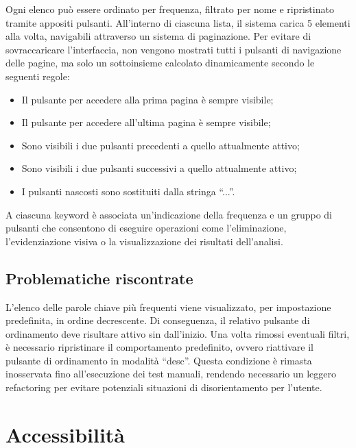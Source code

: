 \vspace{10pt}
\par\noindent Ogni elenco può essere ordinato per frequenza, filtrato per nome e ripristinato tramite appositi pulsanti. All’interno di ciascuna lista, il sistema carica 5 elementi alla volta, navigabili attraverso un sistema di paginazione. Per evitare di sovraccaricare l’interfaccia, non vengono mostrati tutti i pulsanti di navigazione delle pagine, ma solo un sottoinsieme calcolato dinamicamente secondo le seguenti regole:
\begin{itemize}
  \item Il pulsante per accedere alla prima pagina è sempre visibile;
  \item Il pulsante per accedere all’ultima pagina è sempre visibile;
  \item Sono visibili i due pulsanti precedenti a quello attualmente attivo;
  \item Sono visibili i due pulsanti successivi a quello attualmente attivo;
  \item I pulsanti nascosti sono sostituiti dalla stringa “...”.
\end{itemize}

\vspace{10pt}
\par\noindent A ciascuna keyword è associata un’indicazione della frequenza e un gruppo di pulsanti che consentono di eseguire operazioni come l’eliminazione, l’evidenziazione visiva o la visualizzazione dei risultati dell’analisi.

\subsection{Problematiche riscontrate}

\par L’elenco delle parole chiave più frequenti viene visualizzato, per impostazione predefinita, in ordine decrescente. Di conseguenza, il relativo pulsante di ordinamento deve risultare attivo sin dall’inizio. Una volta rimossi eventuali filtri, è necessario ripristinare il comportamento predefinito, ovvero riattivare il pulsante di ordinamento in modalità “desc”. Questa condizione è rimasta inosservata fino all’esecuzione dei test manuali, rendendo necessario un leggero refactoring per evitare potenziali situazioni di disorientamento per l’utente.

\section{Accessibilità}

